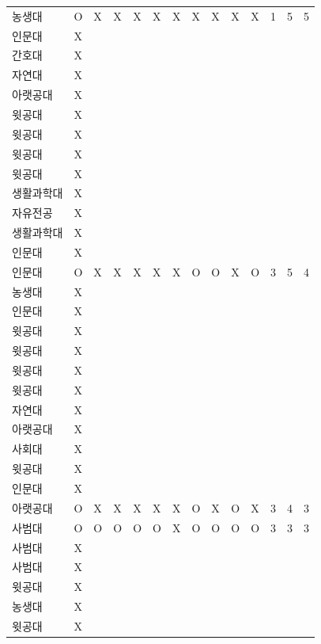 \documentclass[11pt,a4paper]{article}
\begin{document}
\begin{center}
\begin{supertabular}{ | p{2cm} | x{1.6cm} | x{0.5cm} | x{0.5cm} | x{0.5cm} | x{0.5cm} | x{0.5cm} | x{0.5cm} | x{0.5cm} | x{0.5cm} | x{0.5cm} | x{0.5cm} | x{0.5cm} | x{0.5cm} | }
농생대 & O & X & X & X & X & X & X & X & X & X & 1 & 5 & 5 \\
인문대 & X & & & & & & & & & & & & \\
간호대 & X & & & & & & & & & & & & \\
자연대 & X & & & & & & & & & & & & \\
아랫공대 & X & & & & & & & & & & & & \\
윗공대 & X & & & & & & & & & & & & \\
윗공대 & X & & & & & & & & & & & & \\
윗공대 & X & & & & & & & & & & & & \\
윗공대 & X & & & & & & & & & & & & \\
생활과학대 & X & & & & & & & & & & & & \\
자유전공 & X & & & & & & & & & & & & \\
생활과학대 & X & & & & & & & & & & & & \\
인문대 & X & & & & & & & & & & & & \\
인문대 & O & X & X & X & X & X & O & O & X & O & 3 & 5 & 4 \\
농생대 & X & & & & & & & & & & & & \\
인문대 & X & & & & & & & & & & & & \\
윗공대 & X & & & & & & & & & & & & \\
윗공대 & X & & & & & & & & & & & & \\
윗공대 & X & & & & & & & & & & & & \\
윗공대 & X & & & & & & & & & & & & \\
자연대 & X & & & & & & & & & & & & \\
아랫공대 & X & & & & & & & & & & & & \\
사회대 & X & & & & & & & & & & & & \\
윗공대 & X & & & & & & & & & & & & \\
인문대 & X & & & & & & & & & & & & \\
아랫공대 & O & X & X & X & X & X & O & X & O & X & 3 & 4 & 3 \\
사범대 & O & O & O & O & O & X & O & O & O & O & 3 & 3 & 3 \\
사범대 & X & & & & & & & & & & & & \\
사범대 & X & & & & & & & & & & & & \\
윗공대 & X & & & & & & & & & & & & \\
농생대 & X & & & & & & & & & & & & \\
윗공대 & X & & & & & & & & & & & & \\

\end{supertabular}
\end{center}
\end{document}
